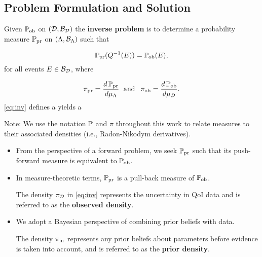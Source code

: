\subsection{Problem Formulation and Solution}
\begin{frame}[t]

\begin{defn}\label{defn:consistency}
Given $\operatorname*{\mathbb{P}_{ob}}$ on $(\mathcal{D}, \mathcal{B}_{\mathcal{D}})$ the \textbf{inverse problem} is to determine a probability measure $\operatorname*{\mathbb{P}_{pr}}$ on $({\Lambda}, \mathcal{B}_{{\Lambda}})$ such that 

\begin{equation}\label{eq:inv}
\operatorname*{\mathbb{P}_{pr}}(Q^{-1}(E)) = \operatorname*{\mathbb{P}_{ob}}(E),
\end{equation}
for all events $E \in \mathcal{B}_{\mathcal{D}}$, where

\begin{equation*}
\operatorname*{\pi_{pr}} = \frac{d\operatorname*{\mathbb{P}_{pr}}}{d\mu_{\Lambda}} \;\text{ and }\; \operatorname*{\pi_{ob}} = \frac{d\operatorname*{\mathbb{P}_{ob}}}{d\mu_{\mathcal{D}}}.
\end{equation*}
\eqref{eq:inv} defines a  yields a 
\end{defn}

Note: {\scriptsize We use the notation $\mathbb{P}$ and $\pi$ throughout this work to relate measures to their associated densities (i.e., Radon-Nikodym derivatives).}
\end{frame}


\begin{frame}[t]
\begin{itemize}
	\item From the perspective of a forward problem, we seek $\operatorname*{\mathbb{P}_{pr}}$ such that its push-forward measure is equivalent to $\operatorname*{\mathbb{P}_{ob}}$.

	\item In measure-theoretic terms, $\operatorname*{\mathbb{P}_{pr}}$ is a pull-back measure of $\operatorname*{\mathbb{P}_{ob}}$.
	\begin{defn}\label{defn:obsden}
The density $\pi_{\mathcal{D}}$ in \eqref{eq:inv} represents the uncertainty in QoI data and is referred to as the \textbf{observed density}.
\end{defn}

	\item We adopt a Bayesian perspective of combining prior beliefs with data.
	\begin{defn}\label{defn:priorden}
The density $\operatorname*{\pi_{in}}$ represents any prior beliefs about parameters before evidence is taken into account, and is referred to as the \textbf{prior density}.
\end{defn}

\end{itemize}

\end{frame}

